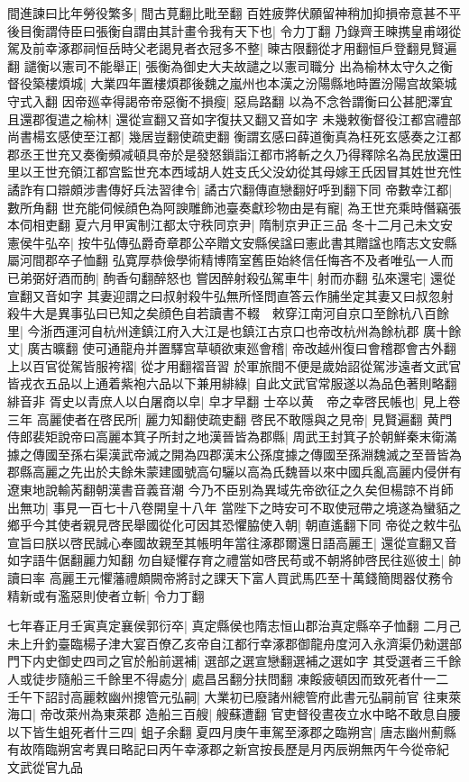 間進諫曰比年勞役繁多|{
	間古莧翻比毗至翻}
百姓疲弊伏願留神稍加抑損帝意甚不平後目衡謂侍臣曰張衡自謂由其計畫令我有天下也|{
	令力丁翻}
乃錄齊王暕携皇甫翊從駕及前幸涿郡祠恒岳時父老謁見者衣冠多不整|{
	暕古限翻從才用翻恒戶登翻見賢遍翻}
譴衡以憲司不能舉正|{
	張衡為御史大夫故譴之以憲司職分}
出為榆林太守久之衡督役築樓煩城|{
	大業四年置樓煩郡後魏之嵐州也本漢之汾陽縣地時置汾陽宫故築城守式入翻}
因帝廵幸得謁帝帝惡衡不損瘦|{
	惡烏路翻}
以為不念咎謂衡曰公甚肥澤宜且還郡復遣之榆林|{
	還從宣翻又音如字復扶又翻又音如字}
未幾敕衡督役江都宫禮部尚書楊玄感使至江都|{
	幾居豈翻使疏吏翻}
衡謂玄感曰薛道衡真為枉死玄感奏之江都郡丞王世充又奏衡頻减頓具帝於是發怒鎻詣江都市將斬之久乃得釋除名為民放還田里以王世充領江都宫監世充本西域胡人姓支氏父没幼從其母嫁王氏因冒其姓世充性譎詐有口辯頗涉書傳好兵法習律令|{
	譎古穴翻傳直戀翻好呼到翻下同}
帝數幸江都|{
	數所角翻}
世充能伺候顔色為阿諛雕飾池臺奏獻珍物由是有寵|{
	為王世充乘時僭竊張本伺相吏翻}
夏六月甲寅制江都太守秩同京尹|{
	隋制京尹正三品}
冬十二月己未文安憲侯牛弘卒|{
	按牛弘傳弘爵奇章郡公卒贈文安縣侯諡曰憲此書其贈諡也隋志文安縣屬河間郡卒子恤翻}
弘寛厚恭儉學術精博隋室舊臣始終信任悔吝不及者唯弘一人而已弟弼好酒而䣱|{
	䣱香句翻醉怒也}
嘗因醉射殺弘駕車牛|{
	射而亦翻}
弘來還宅|{
	還從宣翻又音如字}
其妻迎謂之曰叔射殺牛弘無所怪問直答云作脯坐定其妻又曰叔忽射殺牛大是異事弘曰已知之矣顔色自若讀書不輟　敕穿江南河自京口至餘杭八百餘里|{
	今浙西運河自杭州達鎮江府入大江是也鎮江古京口也帝改杭州為餘杭郡}
廣十餘丈|{
	廣古曠翻}
使可通龍舟并置驛宫草頓欲東廵會稽|{
	帝改越州復曰會稽郡會古外翻}
上以百官從駕皆服袴褶|{
	從才用翻褶音習}
於軍旅間不便是歲始詔從駕涉遠者文武官皆戎衣五品以上通着紫袍六品以下兼用緋綠|{
	自此文武官常服遂以為品色著則略翻緋音非}
胥史以青庶人以白屠商以皁|{
	皁才早翻}
士卒以黄　帝之幸啓民帳也|{
	見上卷三年}
高麗使者在啓民所|{
	麗力知翻使疏吏翻}
啓民不敢隱與之見帝|{
	見賢遍翻}
黄門侍郎裴矩說帝曰高麗本箕子所封之地漢晉皆為郡縣|{
	周武王封箕子於朝鮮秦末衛滿據之傳國至孫右渠漢武帝滅之開為四郡漢末公孫度據之傳國至孫淵魏滅之至晉皆為郡縣高麗之先出於夫餘朱蒙建國號高句驪以高為氏魏晉以來中國兵亂高麗内侵併有遼東地說輸芮翻朝漢書音義音潮}
今乃不臣别為異域先帝欲征之久矣但楊諒不肖師出無功|{
	事見一百七十八卷開皇十八年}
當陛下之時安可不取使冠帶之境遂為蠻貊之鄉乎今其使者親見啓民舉國從化可因其恐懼脇使入朝|{
	朝直遙翻下同}
帝從之敕牛弘宣旨曰朕以啓民誠心奉國故親至其帳明年當往涿郡爾還日語高麗王|{
	還從宣翻又音如字語牛倨翻麗力知翻}
勿自疑懼存育之禮當如啓民苟或不朝將帥啓民往廵彼土|{
	帥讀曰率}
高麗王元懼藩禮頗闕帝將討之課天下富人買武馬匹至十萬錢簡閲器仗務令精新或有濫惡則使者立斬|{
	令力丁翻}


七年春正月壬寅真定襄侯郭衍卒|{
	真定縣侯也隋志恒山郡治真定縣卒子恤翻}
二月己未上升釣臺臨楊子津大宴百僚乙亥帝自江都行幸涿郡御龍舟度河入永濟渠仍勑選部門下内史御史四司之官於船前選補|{
	選部之選宣戀翻選補之選如字}
其受選者三千餘人或徒步隨船三千餘里不得處分|{
	處昌呂翻分扶問翻}
凍餒疲頓因而致死者什一二　壬午下詔討高麗敕幽州摠管元弘嗣|{
	大業初已廢諸州總管府此書元弘嗣前官}
往東萊海口|{
	帝改萊州為東萊郡}
造船三百艘|{
	艘蘇遭翻}
官吏督役晝夜立水中略不敢息自腰以下皆生蛆死者什三四|{
	蛆子余翻}
夏四月庚午車駕至涿郡之臨朔宫|{
	唐志幽州薊縣有故隋臨朔宮考異曰略記曰丙午幸涿郡之新宫按長歷是月丙辰朔無丙午今從帝紀}
文武從官九品

